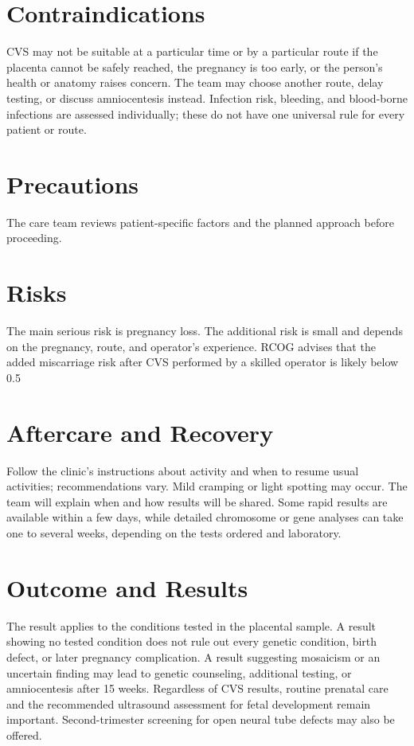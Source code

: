 \section*{Contraindications}
CVS may not be suitable at a particular time or by a particular route if the placenta cannot be safely reached, the pregnancy is too early, or the person's health or anatomy raises concern. The team may choose another route, delay testing, or discuss amniocentesis instead. Infection risk, bleeding, and blood-borne infections are assessed individually; these do not have one universal rule for every patient or route.

\section*{Precautions}
The care team reviews patient-specific factors and the planned approach before proceeding.

\section*{Risks}
The main serious risk is pregnancy loss. The additional risk is small and depends on the pregnancy, route, and operator's experience. RCOG advises that the added miscarriage risk after CVS performed by a skilled operator is likely below 0.5%

\section*{Aftercare and Recovery}
Follow the clinic's instructions about activity and when to resume usual activities; recommendations vary. Mild cramping or light spotting may occur. The team will explain when and how results will be shared. Some rapid results are available within a few days, while detailed chromosome or gene analyses can take one to several weeks, depending on the tests ordered and laboratory.

\section*{Outcome and Results}
The result applies to the conditions tested in the placental sample. A result showing no tested condition does not rule out every genetic condition, birth defect, or later pregnancy complication. A result suggesting mosaicism or an uncertain finding may lead to genetic counseling, additional testing, or amniocentesis after 15 weeks. Regardless of CVS results, routine prenatal care and the recommended ultrasound assessment for fetal development remain important. Second-trimester screening for open neural tube defects may also be offered.

